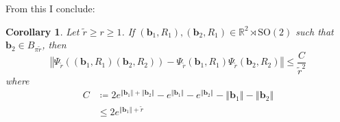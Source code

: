 \documentclass[a4paper,11pt]{scrartcl}
\newcounter{dummy}
\numberwithin{dummy}{section}
\theoremstyle{plain}
\theoremstyle{plain}
\theoremstyle{plain}
\theoremstyle{plain}
\newtheorem{corollary}[dummy]{Corollary}
\theoremstyle{nonumberplain}
\newcommand{\F}[1][R]{\mathbb{#1}} %
\newcommand{\Ltwonorm}[1]{\left\Vert #1 \right\Vert} %
\newcommand{\SO}{\mathrm{SO}}
\begin{document}
	From this I conclude:
	\begin{corollary}
		\label{ApproximateCumm2}
		Let $ \widetilde{r} \ge r \ge 1 $. If $ (\mathbf{b}_{1}, R_{1}), (\mathbf{b}_{2}, R_{1}) \in \F^{2} \rtimes \SO(2) $ such that $ \mathbf{b}_{2} \in B_{\pi \widetilde{r}} $, then
		\begin{equation}
		\label{ApporximateCummIneq}
		\Ltwonorm{\Psi_{\widetilde{r}} \left( (\mathbf{b}_{1}, R_{1}) (\mathbf{b}_{2}, R_{2}) \right) - \Psi_{\widetilde{r}} (\mathbf{b}_{1}, R_{1})  \Psi_{\widetilde{r}} (\mathbf{b}_{2}, R_{2})  }
		\le \frac{C}{\widetilde{r}^{2}}
		\end{equation}
		where
		\begin{align*}
		C
		&\coloneqq 2 e^{\Ltwonorm{\mathbf{b}_{1}} + \Ltwonorm{\mathbf{b}_{2}}} - e^{\Ltwonorm{\mathbf{b}_{1}}} - e^{\Ltwonorm{\mathbf{b}_{2}}} - \Ltwonorm{\mathbf{b}_{1}} - \Ltwonorm{\mathbf{b}_{2}} \\
		&\le 2 e^{\Ltwonorm{\mathbf{b}_{1}} + \widetilde{r}}
		\end{align*}
	\end{corollary}
	
\end{document}
